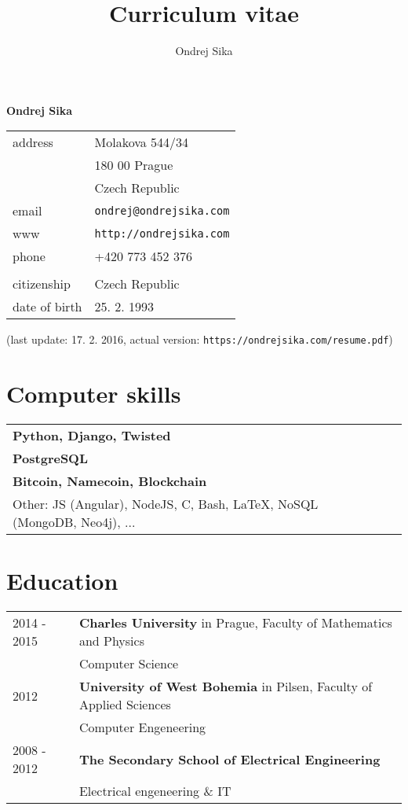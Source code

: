 \documentclass[12pt,a4paper]{article}
\title{Curriculum vitae}
\author{Ondrej Sika}
\begin{document}
\begin{center}
{\LARGE \bf Ondrej Sika}\\
\vspace*{0.2cm}
\begin{tabular}{R{5cm}L{5cm}}
address & Molakova 544/34\\
 & 180 00 Prague\\
 & Czech Republic\\
email & \texttt{ondrej@ondrejsika.com}\\
www & \texttt{http://ondrejsika.com}\\
phone & +420 773 452 376\\
\\
citizenship & Czech Republic\\
date of birth & 25. 2. 1993\\
\end{tabular}

\vspace*{0.2cm}
{\small (last update: 17. 2. 2016, actual version: \texttt{https://ondrejsika.com/resume.pdf})}
\end{center}

\section*{Computer skills}
\begin{tabular}{@{}ll}
{\bf Python, Django, Twisted} & \\
{\bf PostgreSQL} & \\
{\bf Bitcoin, Namecoin, Blockchain} & \\
Other: JS (Angular), NodeJS, C, Bash, LaTeX, NoSQL (MongoDB, Neo4j), ... & \\
\end{tabular}

\section*{Education}
\begin{tabular}{@{}p{2cm}l}
2014 - 2015 & {\bf Charles University} in Prague, Faculty of Mathematics and Physics\\
 & Computer Science\\
2012  & {\bf University of West Bohemia} in Pilsen, Faculty of Applied Sciences\\
 & Computer Engeneering\\
2008 - 2012 & {\bf The Secondary School of Electrical Engineering}\\
 & Electrical engeneering \& IT\\
\end{tabular}
\end{document}

